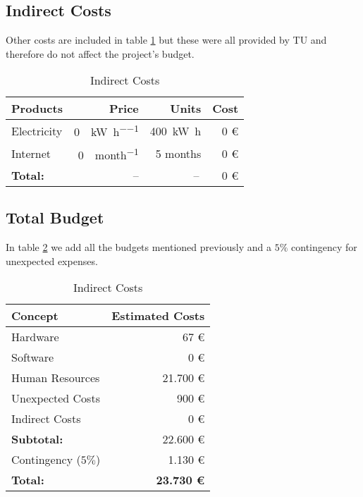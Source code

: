 \subsection{Indirect Costs}

Other costs are included in table \ref{budget::indirect} but these were all provided by \ac{TU} and therefore do not affect the project's budget.

\begin{table}[H]
	\begin{center}
		\begin{tabular}{ |l|r|r|r| }
			\hline
			\bf Products & \bf Price & \bf Units & \bf Cost \\\hline\hline
			
			Electricity & \SI{0}{\EURO\per\kilo\watt\per\hour} & \SI{400}{\kilo\watt\hour} & 0 \euro \\\hline
			
			Internet & \SI{0}{\EURO\per month} & 5 months & 0 \euro
			
			\\\hline\hline
			\bf Total: & -- & --\, & 0 \euro \\\hline
		\end{tabular}
		\caption{Indirect Costs}
		\label{budget::indirect}
	\end{center}
\end{table}
\subsection{Total Budget}
In table \ref{budget::total} we add all the budgets mentioned previously and a $5\%$ contingency for unexpected expenses.

\begin{table}[H]
	\begin{center}
		\begin{tabular}{|l|r|}
			\hline
			\bf Concept & \bf Estimated Costs\\\hline\hline
			
			Hardware & 67 \euro \\\hline
			Software & 0 \euro \\\hline
			Human Resources & 21.700 \euro \\\hline
			Unexpected Costs & 900 \euro \\\hline
			Indirect Costs & 0 \euro \\\hline
			\hline \bf Subtotal: & 22.600 \euro \\\hline
			
			Contingency ($5\%$)	& 1.130 \euro \\\hline
			\hline \bf Total: & \bf 23.730 \euro \\\hline
		\end{tabular}
		\caption{Indirect Costs}
		\label{budget::total}
	\end{center}
\end{table}


